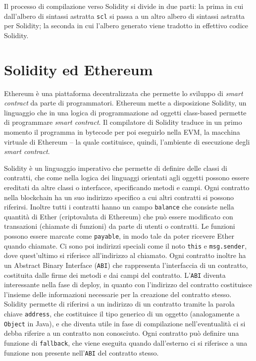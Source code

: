 \documentclass[12pt,a4paper]{report}
\begin{document}
Il processo di compilazione verso Solidity si divide in due parti: la
prima in cui dall'albero di sintassi astratta \texttt{scl} si passa a un
altro albero di sintassi astratta per Solidity; la seconda in cui
l'albero generato viene tradotto in effettivo codice Solidity.

\hypertarget{solidity-ed-ethereum}{%
\section{Solidity ed Ethereum}\label{solidity-ed-ethereum}}

Ethereum è una piattaforma decentralizzata che permette lo sviluppo di
\emph{smart contract} da parte di programmatori. Ethereum mette a
disposizione Solidity, un linguaggio che in una logica di programmazione
ad oggetti class-based permette di programmare \emph{smart contract}. Il
compilatore di Solidity traduce in un primo momento il programma in
bytecode per poi eseguirlo nella EVM, la macchina virtuale di Ethereum
-- la quale costituisce, quindi, l'ambiente di esecuzione degli
\emph{smart contract}.

Solidity è un linguaggio imperativo che permette di definire delle
classi di contratti, che come nella logica dei linguaggi orientati agli
oggetti possono essere ereditati da altre classi o interfacce,
specificando metodi e campi. Ogni contratto nella blockchain ha un suo
indirizzo specifico a cui altri contratti si possono riferirsi. Inoltre
tutti i contratti hanno un campo \texttt{balance} che consiste nella
quantità di Ether (criptovaluta di Ethereum) che può essere modificato
con transazioni (chiamate di funzioni) da parte di utenti o contratti.
Le funzioni possono essere marcate come \texttt{payable}, in modo tale
da poter ricevere Ether quando chiamate. Ci sono poi indirizzi speciali
come il noto \texttt{this} e \texttt{msg.sender}, dove quest'ultimo si
riferisce all'indirizzo al chiamato. Ogni contratto inoltre ha un
Abstract Binary Interface (\texttt{ABI}) che rappresenta l'interfaccia
di un contratto, costituita dalle firme dei metodi e dai campi del
contratto. L'\texttt{ABI} diventa interessante nella fase di deploy, in
quanto con l'indirizzo del contratto costituisce l'insieme delle
informazioni necessarie per la creazione del contratto stesso. Solidity
permette di riferirsi a un indirizzo di un contratto tramite la parola
chiave \texttt{address}, che costituisce il tipo generico di un oggetto
(analogamente a \texttt{Object} in Java), e che diventa utile in fase di
compilazione nell'eventualità ci si debba riferire a un contratto non
conosciuto. Ogni contratto può definire una funzione di
\texttt{fallback}, che viene eseguita quando dall'esterno ci si
riferisce a una funzione non presente nell'\texttt{ABI} del contratto
stesso.
\end{document}
